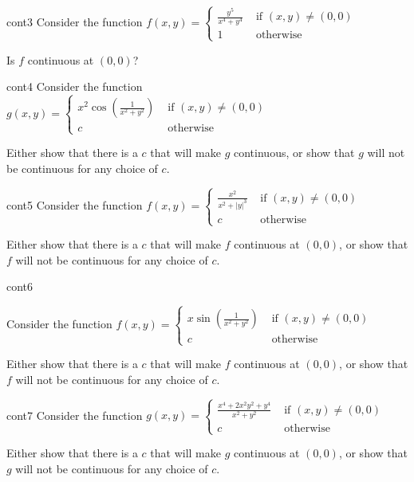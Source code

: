 \begin{problem}{cont3}
Consider the function $f(x,y) = \left\{
		\begin{array}{ll}
			\frac{y^5}{x^4 + y^4} & \text{ if } (x,y) \neq (0,0) \\
			1 & \text{ otherwise } 
		\end{array}
		\right.$
		
		Is $f$ continuous at $(0,0)$?
\end{problem}

\begin{problem}{cont4}
Consider the function  $g(x,y) = \left\{
		\begin{array}{ll}
			x^2\cos(\frac{1}{x^2 + y^2}) & \text{ if } (x,y) \neq (0,0) \\
			c & \text{ otherwise } 
		\end{array}
		\right.$
		
		Either show that there is a $c$ that will make $g$ continuous, or show that $g$ will not be continuous for any choice of $c$.
\end{problem}

\begin{problem}{cont5}
Consider the function  $f(x,y) = \left\{
		\begin{array}{ll}
			\frac{x^2}{x^2 + |y|^3} & \text{ if } (x,y) \neq (0,0) \\
			c & \text{ otherwise } 
		\end{array}
		\right.$
		
		Either show that there is a $c$ that will make $f$ continuous at $(0,0)$, or show that $f$ will not be continuous for any choice of $c$.
\end{problem}

\begin{problem}{cont6}

Consider the function  $f(x,y) = \left\{
		\begin{array}{ll}
			x\sin(\frac{1}{x^2 + y^2}) & \text{ if } (x,y) \neq (0,0) \\
			c & \text{ otherwise } 
		\end{array}
		\right.$
		
		Either show that there is a $c$ that will make $f$ continuous at $(0,0)$, or show that $f$ will not be continuous for any choice of $c$.

\end{problem}

\begin{problem}{cont7}
Consider the function  $g(x,y) = \left\{
		\begin{array}{ll}
			\frac{x^4  +2x^2y^2 +y^4}{x^2 + y^2} & \text{ if } (x,y) \neq (0,0) \\
			c & \text{ otherwise } 
		\end{array}
		\right.$
		
		Either show that there is a $c$ that will make $g$ continuous at $(0,0)$, or show that $g$ will not be continuous for any choice of $c$.
\end{problem}